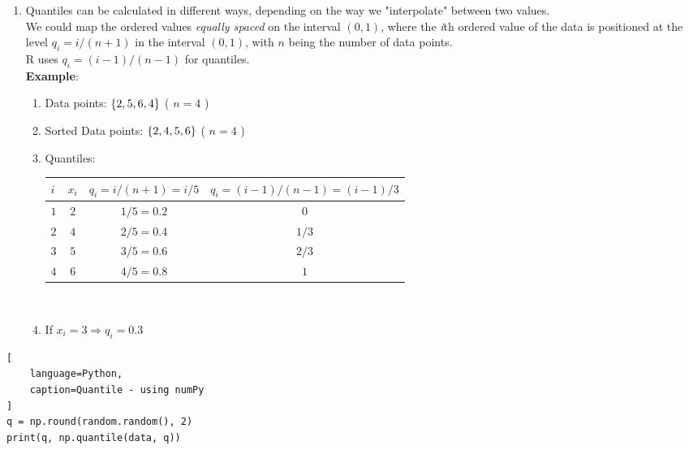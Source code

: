 \begin{enumerate}
    \item Quantiles can be calculated in different ways, depending on the way we "interpolate" between two values. \hfill \cite{statistics/book/Statistics-for-Data-Scientists/Maurits-Kaptein} \\
    We could map the ordered values \textit{equally spaced} on the interval $(0, 1)$, where the \textit{i}th ordered value of the data is positioned at the level $q_i = {i}/{(n + 1)}$ in the interval $(0, 1)$, with $n$ being the number of data points. \hfill \cite{statistics/book/Statistics-for-Data-Scientists/Maurits-Kaptein} \\
    R uses $q_i = (i - 1)/(n - 1)$ for quantiles. \hfill \cite{statistics/book/Statistics-for-Data-Scientists/Maurits-Kaptein} \\
    \textbf{Example}: \hfill \cite{statistics/book/Statistics-for-Data-Scientists/Maurits-Kaptein}
    \begin{enumerate}
        \item Data points: $\left\{2, 5, 6, 4\right\}$ ( $n=4$ )
        \item Sorted Data points: $\left\{2, 4, 5, 6\right\}$ ( $n=4$ )
        \item Quantiles:\\[0.2cm]
        \begin{tabular}{|l|c|c|c|}
            \hline
            $i$ & $x_i$ & $q_i = i/(n+1) = i/5$ & $q_i = (i-1)/(n-1) = (i-1)/3$ \\ [0.1cm]
            \hline
            $1$ & $2$ & $1/5 = 0.2$ & $0$ \\
            $2$ & $4$ & $2/5 = 0.4$ & $1/3$ \\
            $3$ & $5$ & $3/5 = 0.6$ & $2/3$ \\
            $4$ & $6$ & $4/5 = 0.8$ & $1$ \\
            \hline
        \end{tabular}\\

        \item If $x_i = 3 \Rightarrow q_i = 0.3$
    \end{enumerate}
\end{enumerate}

\begin{lstlisting}[
    language=Python,
    caption=Quantile - using numPy
]
q = np.round(random.random(), 2)
print(q, np.quantile(data, q))
\end{lstlisting}




